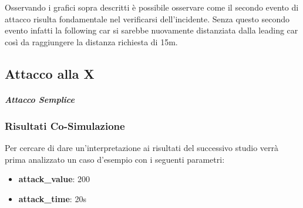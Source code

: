 Osservando i grafici sopra descritti è possibile osservare come il secondo evento di attacco risulta fondamentale nel verificarsi dell'incidente. Senza questo secondo evento infatti la following car si sarebbe nuovamente distanziata dalla leading car così da raggiungere la distanza richiesta di 15m.

\subsection{Attacco alla X}
\subparagraph{Attacco Semplice}
\subsubsection{Risultati Co-Simulazione}
Per cercare di dare un'interpretazione ai risultati del successivo studio verrà prima analizzato un caso d'esempio con i seguenti parametri:
\begin{itemize}
	\item \textbf{attack\_value}: 200
	\item \textbf{attack\_time}: 20s
\end{itemize}


